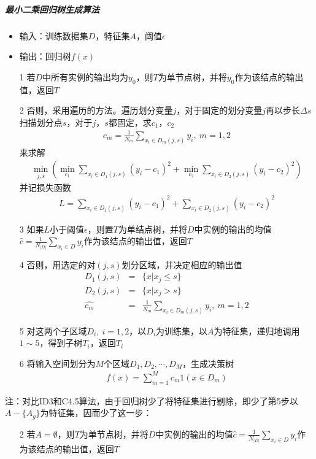 \subparagraph{最小二乘回归树生成算法}
\begin{itemize}
\item 输入：训练数据集$D$，特征集$A$，阈值$\epsilon$
\item 输出：回归树$f(x)$
\item[1] 若$D$中所有实例的输出均为$y_0$，则$T$为单节点树，并将$y_0$作为该结点的输出值，返回$T$
\item[2] 否则，采用遍历的方法。遍历划分变量$j$，对于固定的划分变量$j$再以步长$\Delta s$扫描划分点$s$，对于$j$，$s$都固定，求$c_1$，$c_2$
\begin{eqnarray}
c_m=\frac{1}{N_m}\sum_{x_i\in D_m(j,s)}y_i,\ m=1,2
\end{eqnarray}
来求解
\begin{eqnarray}
\min_{j,s}
\left(
	\min_{c_1}\sum_{x_i\in D_1(j,s)}(y_i-c_1)^2+\min_{c_2}\sum_{x_i\in D_2(j,s)}(y_i-c_2)^2
\right)
\end{eqnarray}
并记损失函数
\begin{eqnarray}
L=\sum_{x_i\in D_1(j,s)}(y_i-c_1)^2+\sum_{x_i\in D_2(j,s)}(y_i-c_2)^2
\end{eqnarray}
\item[3] 如果$L$小于阈值$\epsilon$，则置$T$为单结点树，并将$D$中实例的输出的均值$\hat{c}=\frac{1}{N_{|D|}}\sum_{x_i\in D}y_i$作为该结点的输出值，返回$T$
\item[4] 否则，用选定的对$(j,s)$划分区域，并决定相应的输出值
\begin{eqnarray}
D_1(j,s)&=&\{x|x_j\leq s\}\\
D_2(j,s)&=&\{x|x_j> s\}\\
\hat{c_m}&=&\frac{1}{N_m}\sum_{x_i\in D_m(j,s)}y_i,\ m=1,2
\end{eqnarray}
\item[5] 对这两个子区域$D_i,\ i=1,2$，以$D_i$为训练集，以$A$为特征集，递归地调用$1\sim 5$，得到子树$T_i$，返回$T_i$
\item[6] 将输入空间划分为$M$个区域$D_1,D_2,\cdots,D_M$，生成决策树
\begin{eqnarray}
f(x)=\sum_{m=1}^M c_m1(x\in D_m)
\end{eqnarray}
\end{itemize}


注：对比ID3和C4.5算法，由于回归树少了将特征集进行剔除，即少了第5步以$A-\{A_g\}$为特征集，因而少了这一步：
\begin{itemize}
\item[2] 若$A=\emptyset$，则$T$为单节点树，并将$D$中实例的输出的均值$\hat{c}=\frac{1}{N_{|D|}}\sum_{x_i\in D}y_i$作为该结点的输出值，返回$T$
\end{itemize}


